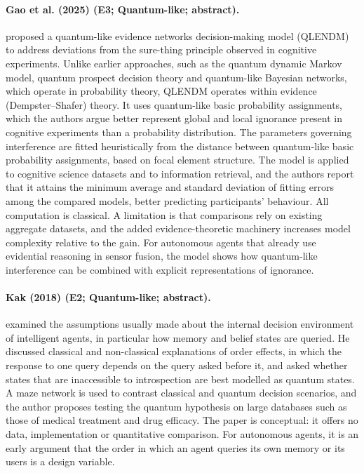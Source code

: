 \documentclass[10pt,a4paper]{article}
\begin{document}
\paragraph{Gao et al. (2025) (E3; Quantum-like; abstract).} \citet{Gao2025} proposed a quantum-like evidence networks decision-making model (QLENDM) to address deviations from the sure-thing principle observed in cognitive experiments. Unlike earlier approaches, such as the quantum dynamic Markov model, quantum prospect decision theory and quantum-like Bayesian networks, which operate in probability theory, QLENDM operates within evidence (Dempster--Shafer) theory. It uses quantum-like basic probability assignments, which the authors argue better represent global and local ignorance present in cognitive experiments than a probability distribution. The parameters governing interference are fitted heuristically from the distance between quantum-like basic probability assignments, based on focal element structure. The model is applied to cognitive science datasets and to information retrieval, and the authors report that it attains the minimum average and standard deviation of fitting errors among the compared models, better predicting participants' behaviour. All computation is classical. A limitation is that comparisons rely on existing aggregate datasets, and the added evidence-theoretic machinery increases model complexity relative to the gain. For autonomous agents that already use evidential reasoning in sensor fusion, the model shows how quantum-like interference can be combined with explicit representations of ignorance.

\paragraph{Kak (2018) (E2; Quantum-like; abstract).} \citet{Kak2018} examined the assumptions usually made about the internal decision environment of intelligent agents, in particular how memory and belief states are queried. He discussed classical and non-classical explanations of order effects, in which the response to one query depends on the query asked before it, and asked whether states that are inaccessible to introspection are best modelled as quantum states. A maze network is used to contrast classical and quantum decision scenarios, and the author proposes testing the quantum hypothesis on large databases such as those of medical treatment and drug efficacy. The paper is conceptual: it offers no data, implementation or quantitative comparison. For autonomous agents, it is an early argument that the order in which an agent queries its own memory or its users is a design variable.
\end{document}
